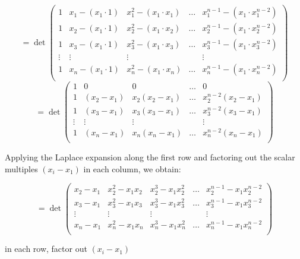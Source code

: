 \documentclass[a4paper]{article}
\theoremstyle{definition}
\begin{document}
$$
= \det
\begin{pmatrix}
    1 & x_1-(x_1 \cdot 1) & x_1^2 - (x_1 \cdot x_1) & \ldots & x_1^{n-1} - (x_1 \cdot x_1^{n-2}) \\
    1 & x_2-(x_1 \cdot 1) & x_2^2 - (x_1 \cdot x_2) & \ldots & x_2^{n-1} - (x_1 \cdot x_2^{n-2}) \\
    1 & x_3-(x_1 \cdot 1) & x_3^2 - (x_1 \cdot x_3) & \ldots & x_3^{n-1} - (x_1 \cdot x_3^{n-2}) \\
    \vdots & \vdots & \vdots &  & \vdots\\
    1 & x_n-(x_1 \cdot 1) & x_n^2 - (x_1 \cdot x_n) & \ldots & x_n^{n-1} - (x_1 \cdot x_n^{n-2}) \\
\end{pmatrix}
$$
$$
= \det
\begin{pmatrix}
    1      & 0           & 0              & \ldots & 0 \\
    1      & (x_2 - x_1) & x_2(x_2 - x_1) & \ldots & x_2^{n-2}(x_2 - x_1) \\
    1      & (x_3 - x_1) & x_3(x_3 - x_1) & \ldots & x_3^{n-2}(x_3 - x_1) \\
    \vdots & \vdots      & \vdots         &        & \vdots \\
    1      & (x_n - x_1) & x_n(x_n - x_1) & \ldots & x_n^{n-2}(x_n - x_1) \\
\end{pmatrix}
$$

Applying the Laplace expansion along the first row and factoring out the scalar multiples $(x_i - x_1)$ in each column, we obtain: 

$$
= \det
\begin{pmatrix}
    x_2-x_1 & x_2^2 - x_1 x_2 & x_2^3 - x_1 x_2^2 & \ldots & x_2^{n-1} - x_1 x_2^{n-2} \\
    x_3-x_1 & x_3^2 - x_1 x_3 & x_3^3 - x_1 x_3^2 & \ldots & x_3^{n-1} - x_1 x_3^{n-2} \\
    \vdots & \vdots & \vdots &  & \vdots\\
    x_n-x_1 & x_n^2 - x_1 x_n & x_n^3 - x_1 x_n^2 & \ldots & x_n^{n-1} - x_1 x_n^{n-2} \\
\end{pmatrix}
$$

in each row, factor out $(x_i - x_1)$
\end{document}
